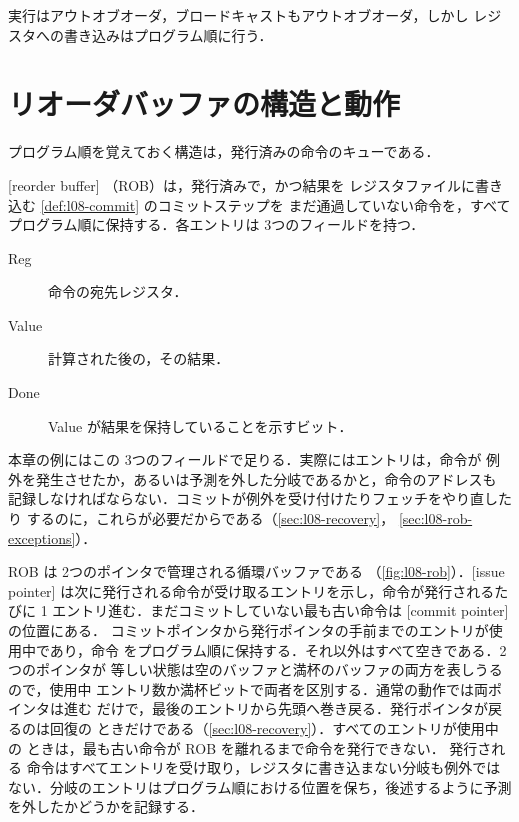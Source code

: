 \documentclass[../main.tex]{subfiles}
\begin{document}
\begin{keypoint}
  実行はアウトオブオーダ，ブロードキャストもアウトオブオーダ，しかし
  レジスタへの書き込みはプログラム順に行う．
\end{keypoint}

\section{リオーダバッファの構造と動作}
\label{sec:l08-rob}

プログラム順を覚えておく構造は，発行済みの命令のキューである．

\begin{definition}[リオーダバッファ]
  \label{def:l08-rob}
  [reorder buffer]%
  （ROB）は，発行済みで，かつ結果を
  レジスタファイルに書き込む \cref{def:l08-commit} のコミットステップを
  まだ通過していない命令を，すべてプログラム順に保持する．各エントリは
  3つのフィールドを持つ．
  \begin{description}
    \item[Reg] 命令の宛先レジスタ．
    \item[Value] 計算された後の，その結果．
    \item[Done] Value が結果を保持していることを示すビット．
  \end{description}
\end{definition}

本章の例にはこの 3つのフィールドで足りる．実際にはエントリは，命令が
例外を発生させたか，あるいは予測を外した分岐であるかと，命令のアドレスも
記録しなければならない．コミットが例外を受け付けたりフェッチをやり直したり
するのに，これらが必要だからである（\cref{sec:l08-recovery}，
\cref{sec:l08-rob-exceptions}）．

ROB は 2つのポインタで管理される循環バッファである
（\cref{fig:l08-rob}）．[issue pointer]%
は次に発行される命令が受け取るエントリを示し，命令が発行されるたびに
1 エントリ進む．まだコミットしていない最も古い命令は
[commit pointer]の位置にある．
コミットポインタから発行ポインタの手前までのエントリが使用中であり，命令
をプログラム順に保持する．それ以外はすべて空きである．2つのポインタが
等しい状態は空のバッファと満杯のバッファの両方を表しうるので，使用中
エントリ数か満杯ビットで両者を区別する．通常の動作では両ポインタは進む
だけで，最後のエントリから先頭へ巻き戻る．発行ポインタが戻るのは回復の
ときだけである（\cref{sec:l08-recovery}）．すべてのエントリが使用中の
ときは，最も古い命令が ROB を離れるまで命令を発行できない．%
発行される
命令はすべてエントリを受け取り，レジスタに書き込まない分岐も例外では
ない．分岐のエントリはプログラム順における位置を保ち，後述するように予測
を外したかどうかを記録する．
\end{document}
